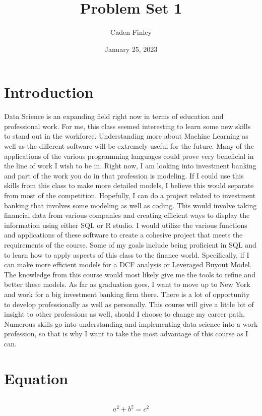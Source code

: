 \documentclass{article}
\title{Problem Set 1}
\author{Caden Finley}
\date{January 25, 2023}
\begin{document}
\maketitle


\section{Introduction}

Data Science is an expanding field right now in terms of education and professional work. For me, this class seemed interesting to learn some new skills to stand out in the workforce. Understanding more about Machine Learning as well as the different software will be extremely useful for the future. Many of the applications of the various programming languages could prove very beneficial in the line of work I wish to be in. Right now, I am looking into investment banking and part of the work you do in that profession is modeling. If I could use this skills from this class to make more detailed models, I believe this would separate from most of the competition. Hopefully, I can do a project related to investment banking that involves some modeling as well as coding. This would involve taking financial data from various companies and creating efficient ways to display the information using either SQL or R studio. I would utilize the various functions and applications of these software to create a cohesive project that meets the requirements of the course. Some of my goals include being proficient in SQL and to learn how to apply aspects of this class to the finance world. Specifically, if I can make more efficient models for a DCF analysis or Leveraged Buyout Model. The knowledge from this course would most likely give me the tools to refine and better these models. As far as graduation goes, I want to move up to New York and work for a big investment banking firm there. There is a lot of opportunity to develop professionally as well as personally. This course will give a little bit of insight to other professions as well, should I choose to change my career path. Numerous skills go into understanding and implementing data science into a work profession, so that is why I want to take the most advantage of this course as I can.  

\section{Equation}

\begin{displaymath}
\end{displaymath}

\[ a^2 + b^2 = c^2 \]
\end{document}
